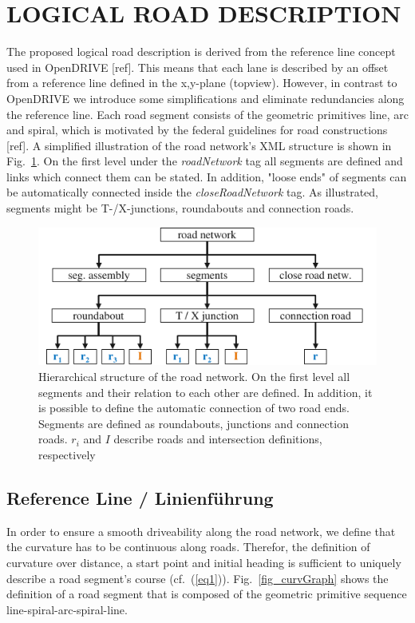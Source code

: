 \documentclass[a4paper, 10pt, conference]{ieeeconf}      %
\begin{document}
\section{LOGICAL ROAD DESCRIPTION}
The proposed logical road description is derived from the reference line concept used in OpenDRIVE [ref]. This means that each lane is described by an offset from a reference line defined in the x,y-plane (topview). However, in contrast to OpenDRIVE we introduce some simplifications and eliminate redundancies along the reference line. Each road segment consists of the geometric primitives line, arc and spiral, which is motivated by the federal guidelines for road constructions [ref]. A simplified illustration of the road network's XML structure is shown in Fig.~\ref{fig_schema}. On the first level under the \textit{roadNetwork} tag all segments are defined and links which connect them can be stated. In addition, "loose ends" of segments can be automatically connected inside the \textit{closeRoadNetwork} tag. As illustrated, segments might be T-/X-junctions, roundabouts and connection roads. 
\begin{figure}[thpb] 		
	\centering
	\includegraphics{fig/schema.pdf}
	\caption{Hierarchical structure of the road network. On the first level all segments and their relation to each other are defined. In addition, it is possible to define the automatic connection of two road ends. Segments are defined as roundabouts, junctions and connection roads. $r_i$ and $I$ describe roads and intersection definitions, respectively}
	\label{fig_schema}
\end{figure}
\subsection{Reference Line / Linienführung} %
In order to ensure a smooth driveability along the road network, we define that the curvature has to be continuous along roads. Therefor, the definition of curvature over distance, a start point and initial heading is sufficient to uniquely describe a road segment's course (cf.~(\ref{eq1})). Fig.~\ref{fig_curvGraph} shows the definition of a road segment that is composed of the geometric primitive sequence line-spiral-arc-spiral-line.
\end{document}
